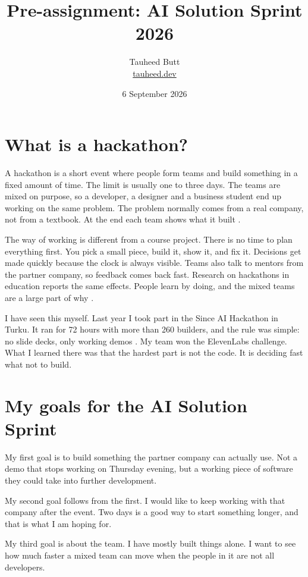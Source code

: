 \documentclass[11pt,a4paper]{article}
\title{\vspace{-1.4cm}Pre-assignment: AI Solution Sprint 2026}
\author{Tauheed Butt \\ \small \href{https://tauheed.dev}{tauheed.dev}}
\date{6 September 2026}
\begin{document}
\maketitle

\section*{What is a hackathon?}

A hackathon is a short event where people form teams and build something in a
fixed amount of time. The limit is usually one to three days. The teams are mixed
on purpose, so a developer, a designer and a business student end up working on
the same problem. The problem normally comes from a real company, not from a
textbook. At the end each team shows what it built \cite{nolte2023}.

The way of working is different from a course project. There is no time to plan
everything first. You pick a small piece, build it, show it, and fix it.
Decisions get made quickly because the clock is always visible. Teams also talk
to mentors from the partner company, so feedback comes back fast. Research on
hackathons in education reports the same effects. People learn by doing, and the
mixed teams are a large part of why \cite{medina2020}.

I have seen this myself. Last year I took part in the Since AI Hackathon in
Turku. It ran for 72 hours with more than 260 builders, and the rule was simple:
no slide decks, only working demos \cite{sinceai_projects}. My team won the
ElevenLabs challenge. What I learned there was that the hardest part is not the
code. It is deciding fast what not to build.

\section*{My goals for the AI Solution Sprint}

My first goal is to build something the partner company can actually use. Not a
demo that stops working on Thursday evening, but a working piece of software they
could take into further development.

My second goal follows from the first. I would like to keep working with that
company after the event. Two days is a good way to start something longer, and
that is what I am hoping for.

My third goal is about the team. I have mostly built things alone. I want to see
how much faster a mixed team can move when the people in it are not all
developers.
\end{document}
